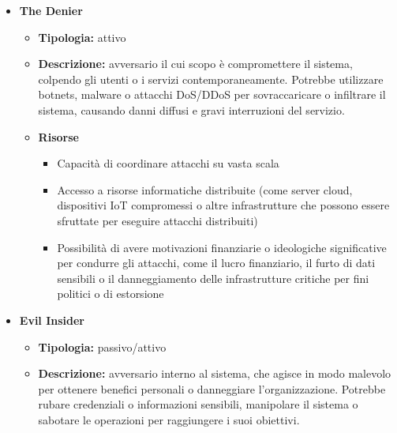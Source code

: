 \begin{itemize}
        \item \textbf{The Denier}
            \begin{itemize}
                \item \textbf{Tipologia:} attivo
                
                \item \textbf{Descrizione:} avversario il cui scopo è compromettere il sistema, colpendo gli utenti o i servizi contemporaneamente.
                Potrebbe utilizzare botnets, malware o attacchi DoS/DDoS per sovraccaricare o infiltrare il sistema, causando danni diffusi e gravi interruzioni del servizio.
                
                \item \textbf{Risorse}
                    \begin{itemize}
                        \item Capacità di coordinare attacchi su vasta scala

                        \vspace{3mm}

                        \item Accesso a risorse informatiche distribuite (come server cloud, dispositivi IoT compromessi o altre infrastrutture che possono essere sfruttate per eseguire attacchi distribuiti)

                        \vspace{3mm}

                        \item Possibilità di avere motivazioni finanziarie o ideologiche significative per condurre gli attacchi, come il lucro finanziario, il furto di dati sensibili o il danneggiamento delle infrastrutture critiche per fini politici o di estorsione
                    \end{itemize}
            \end{itemize}


        \item \textbf{Evil Insider}
            \begin{itemize}
                \item \textbf{Tipologia:} passivo/attivo
                
                \item \textbf{Descrizione:} avversario interno al sistema, che agisce in modo malevolo per ottenere benefici personali o danneggiare l'organizzazione.
                Potrebbe rubare credenziali o informazioni sensibili, manipolare il sistema o sabotare le operazioni per raggiungere i suoi obiettivi.
                

\end{itemize}
\end{itemize}
